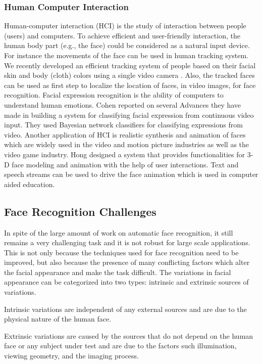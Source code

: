 \subsubsection{Human Computer Interaction}
Human-computer interaction (HCI) is the study of interaction between
people (users) and computers. To achieve efficient and user-friendly
interaction, the human body part (e.g., the face) could be
considered as a natural input device. For instance the movements of
the face can be used in human tracking system. We recently developed
an efficient tracking system of people based on their facial skin
and body (cloth) colors using a single video camera \cite{Charay05}.
Also, the tracked faces can be used as first step to localize the
location of faces, in video images, for face recognition. Facial
expression recognition is the ability of computers to understand
human emotions. Cohen \etal \cite{Cohen03} reported on several
Advances they have made in building a system for classifying facial
expression from continuous video input. They used Bayesian network
classifiers for classifying expressions from video. Another
application of HCI is realistic synthesis and animation of faces
which are widely used in the video and motion picture industries as
well as the video game industry. Hong \etal \cite{Hong02} designed a
system that provides functionalities for 3-D face modeling and
animation with the help of user interactions. Text and speech
streams can be used to drive the face animation which is used in
computer aided education.

\subsection{Face Recognition Challenges} In spite of the large amount of work on
automatic face recognition, it still remains a very challenging task
and it is not robust for large scale applications. This is not only
because the techniques used for face recognition need to be
improved, but also because the presence of many conflicting factors
which alter the facial appearance and make the task difficult. The
variations in facial appearance can be categorized into two types:
intrinsic and extrinsic sources of variations.

\bi \item Intrinsic variations are independent of any external
sources and are due to the physical nature of the human face.
\item Extrinsic variations are caused by the sources that do not depend on the human
face or any subject under test and are due to the factors such
illumination, viewing geometry, and the imaging process. \ei


